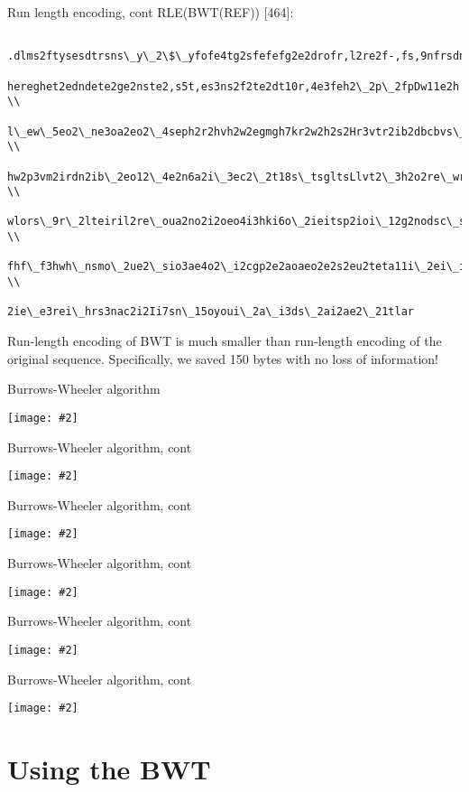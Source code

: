 \documentclass{beamer}
\renewcommand{\c}[1]{\begin{center}#1\end{center}}
\newcommand{\gr}[2][.95]{\c{\texttt{[image: \#2]}}}
\begin{document}
\begin{frame}{Run length encoding, cont}
    \tiny
    RLE(BWT(REF)) [464]:
    \begin{verbatim}
        .dlms2ftysesdtrsns\_y\_2\$\_yfofe4tg2sfefefg2e2drofr,l2re2f-,fs,9nfrsdn2\\
        hereghet2edndete2ge2nste2,s5t,es3ns2f2te2dt10r,4e3feh2\_2p\_2fpDw11e2h \\
        l\_ew\_5eo2\_ne3oa2eo2\_4seph2r2hvh2w2egmgh7kr2w2h2s2Hr3vtr2ib2dbcbvs\_2t \\
        hw2p3vm2irdn2ib\_2eo12\_4e2n6a2i\_3ec2\_2t18s\_tsgltsLlvt2\_3h2o2re\_wr2ad2 \\
        wlors\_9r\_2lteiril2re\_oua2no2i2oeo4i3hki6o\_2ieitsp2ioi\_12g2nodsc\_s3\_g \\
        fhf\_f3hwh\_nsmo\_2ue2\_sio3ae4o2\_i2cgp2e2aoaeo2e2s2eu2teta11i\_2ei\_in\_2a \\
        2ie\_e3rei\_hrs3nac2i2Ii7sn\_15oyoui\_2a\_i3ds\_2ai2ae2\_21tlar
    \end{verbatim}
    \bigskip \normalsize
    Run-length encoding of BWT is much smaller than run-length encoding of the original sequence. Specifically, we saved 150 bytes with no loss of information!
\end{frame}

\begin{frame}{Burrows-Wheeler algorithm}
\gr{l6_figs/s22_bwt1.png}
\end{frame}

\begin{frame}{Burrows-Wheeler algorithm, cont}
\gr{l6_figs/s23_bwt2.png}
\end{frame}

\begin{frame}{Burrows-Wheeler algorithm, cont}
\gr{l6_figs/s24_bwt3.png}
\end{frame}

\begin{frame}{Burrows-Wheeler algorithm, cont}
\gr{l6_figs/s25_bwt4.png}
\end{frame}

\begin{frame}{Burrows-Wheeler algorithm, cont}
\gr{l6_figs/s26_bwt5.png}
\end{frame}

\begin{frame}{Burrows-Wheeler algorithm, cont}
\gr{l6_figs/s27_bwt6.png}
\end{frame}

\section{Using the BWT}
\end{document}
